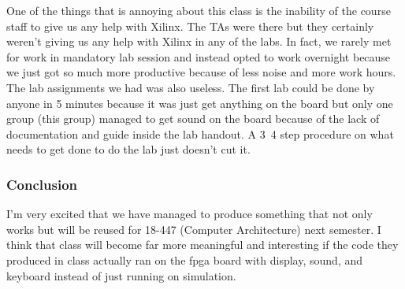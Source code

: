 \documentclass[10pt]{report}
\begin{document}
One of the things that is annoying about this class is the inability of the course staff to give us any help with Xilinx. The TAs were there but they certainly weren't giving us any help with Xilinx in any of the labs. In fact, we rarely met for work in mandatory lab session and instead opted to work overnight because we just got so much more productive because of less noise and more work hours. The lab assignments we had was also useless. The first lab could be done by anyone in 5 minutes because it was just get anything on the board but only one group (this group) managed to get sound on the board because of the lack of documentation and guide inside the lab handout. A 3~4 step procedure on what needs to get done to do the lab just doesn't cut it.

\subsubsection{Conclusion}

I'm very excited that we have managed to produce something that not only works but will be reused for 18-447 (Computer Architecture) next semester. I think that class will become far more meaningful and interesting if the code they produced in class actually ran on the fpga board with display, sound, and keyboard instead of just running on simulation.
\end{document}
